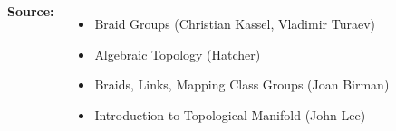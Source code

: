 \documentclass[25 pt,margin=0.9in,innermargin=-4.5in,blockverticalspace=-0.25in]{tikzposter}
\begin{document}
\begin{columns}
{        \textbf{Source:}
        \begin{itemize}
            \item Braid Groups (Christian Kassel, Vladimir Turaev)
            \item Algebraic Topology (Hatcher)
            \item Braids, Links, Mapping Class Groups (Joan Birman)
            \item Introduction to Topological Manifold (John Lee)
        \end{itemize}
    }

    
\end{columns}
\end{document}
